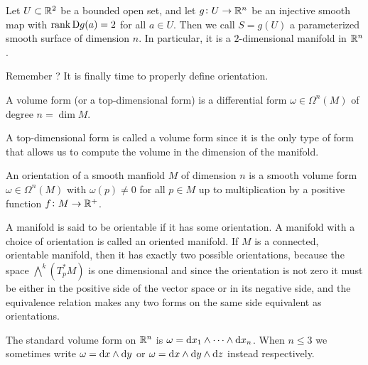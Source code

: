 \documentclass[11pt,a4paper]{article}
\begin{document}
\begin{definition}
  Let $U \subset \mathbb{R}^2$ be a bounded open set,
  and let $g \colon U \to \mathbb{R}^n$ be an injective smooth map with
  $\operatorname{rank} \mathrm{D} g(a) = 2$ for all $a \in U$.
  Then we call $S = g(U)$ a parameterized smooth surface of dimension $n$.
  In particular, it is a $2$-dimensional manifold in $\mathbb{R}^n$.
\end{definition}

Remember ?
It is finally time to properly define orientation.

\begin{definition}
  A volume form (or a top-dimensional form) is a differential form
  $\omega \in \Omega^n(M)$ of degree $n = \dim M$.
\end{definition}
\begin{remark}
  A top-dimensional form is called a volume form since it is the only
  type of form that allows us to compute the volume in the dimension
  of the manifold.
\end{remark}

\begin{definition}
  \label{def:orientation-via-forms}
  An orientation of a smooth manfiold $M$ of dimension $n$ is
  a smooth volume form $\omega \in \Omega^n(M)$ with $\omega(p) \neq 0$
  for all $p \in M$ up to multiplication by a positive function
  $f \colon M \to \mathbb{R}^+$.
\end{definition}

\begin{remark}
  A manifold is said to be orientable if it has some orientation.
  A manifold with a choice of orientation is called an oriented manifold.
  If $M$ is a connected, orientable manifold, then it has exactly two
  possible orientations,
  because the space $\bigwedge^{\!k}(T^*_p M)$ is one dimensional and since
  the orientation is not zero it must be either in the positive
  side of the vector space or in its negative side,
  and the equivalence relation makes any two forms on the same side
  equivalent as orientations.
\end{remark}

\begin{definition}
  \label{def:standard-orientation}
  The standard volume form on $\mathbb{R}^n$ is
  $\omega = \dx_1 \wedge \cdots \wedge \dx_n$.
  When $n \le 3$ we sometimes write $\omega = \dx \wedge \dy$
  or $\omega = \dx \wedge \dy \wedge \dz$ instead respectively.
\end{definition}
\end{document}
